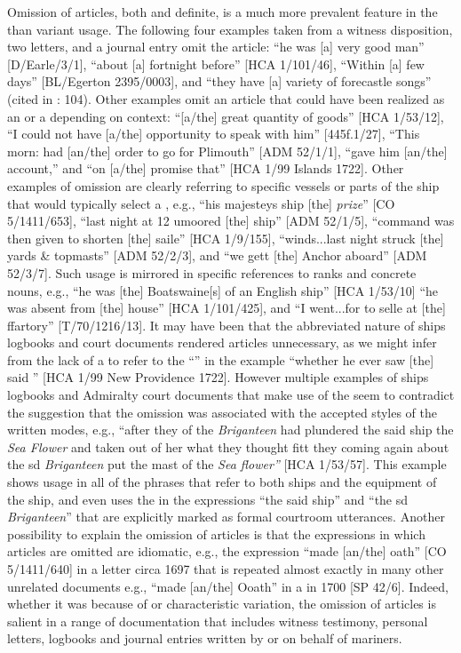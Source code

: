 Omission of articles, both  and definite, is a much more prevalent feature in the  than variant usage. The following four examples taken from a witness disposition, two letters, and a journal entry omit the  article: “he was [a] very good man” [D/Earle/3/1], “about [a] fortnight before” [HCA 1/101/46], “Within [a] few days” [BL/Egerton 2395/0003], and “they have [a] variety of forecastle songs” (cited in \citealt{Palmer1986}: 104). Other examples omit an article that could have been realized as an  or a  depending on context: “[a/the] great quantity of goods” [HCA 1/53/12], “I could not have [a/the] opportunity to speak with him” [445f.1/27], “This morn: had [an/the] order to go for Plimouth” [ADM 52/1/1], “gave him [an/the] account,” and “on [a/the] promise that” [HCA 1/99  Islands 1722]. Other examples of omission are clearly referring to specific vessels or parts of the ship that would typically select a , e.g., “his majesteys ship [the] \textit{ prize}” [CO 5/1411/653], “last night at 12 umoored [the] ship” [ADM 52/1/5], “command was then given to shorten [the] saile” [HCA 1/9/155], “winds...last night struck [the] yards \& topmasts” [ADM 52/2/3], and “we gett [the] Anchor aboard” [ADM 52/3/7]. Such usage is mirrored in specific references to ranks and concrete nouns, e.g., “he was [the] Boatswaine[s]  of an English ship” [HCA 1/53/10] “he was absent from [the] house” [HCA 1/101/425], and “I went...for to selle at [the] ffartory” [T/70/1216/13]. It may have been that the abbreviated nature of ships logbooks and court documents rendered articles unnecessary, as we might infer from the lack of a  to refer to the “” in the example “whether he ever saw [the] said ” [HCA 1/99 New Providence 1722]. However multiple examples of ships logbooks and Admiralty court documents that make use of the  seem to contradict the suggestion that the omission was associated with the accepted styles of the written modes, e.g., “after they of the \textit{Briganteen} had plundered the said ship the \textit{Sea Flower} and taken out of her what they thought fitt they coming again about the sd \textit{Briganteen} put the mast of the \textit{Sea flower”} [HCA 1/53/57]. This example shows  usage in all of the phrases that refer to both ships and the equipment of the ship, and even uses the  in the expressions “the said ship” and “the sd \textit{Briganteen}” that are explicitly marked as formal courtroom utterances. Another possibility to explain the omission of articles is that the expressions in which articles are omitted are idiomatic, e.g., the expression “made [an/the] oath” [CO 5/1411/640] in a letter circa 1697 that is repeated almost exactly in many other unrelated documents e.g., “made [an/the] Ooath” in a  in 1700 [SP 42/6]. Indeed, whether it was because of  or characteristic variation, the omission of articles is salient in a range of documentation that includes witness testimony, personal letters, logbooks and journal entries written by or on behalf of mariners. 

